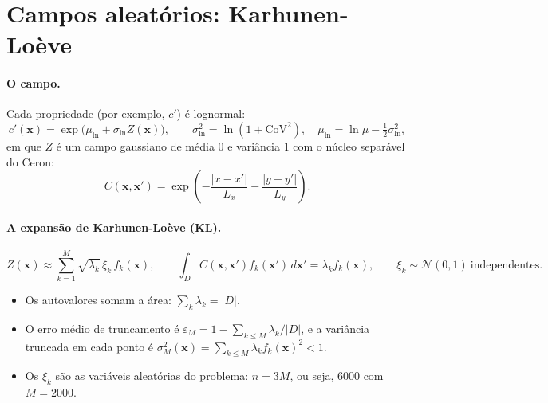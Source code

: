 \section{Campos aleatórios: Karhunen-Loève}
\label{sec:campos}

\paragraph{O campo.} Cada propriedade (por exemplo, $c'$) é lognormal:
\begin{equation}
  c'(\bm x) = \exp\big(\mu_{\ln} + \sigma_{\ln} Z(\bm x)\big), \qquad
  \sigma_{\ln}^2 = \ln(1 + \mathrm{CoV}^2), \quad \mu_{\ln} = \ln\mu - \tfrac12 \sigma_{\ln}^2 ,
\end{equation}
em que $Z$ é um campo gaussiano de média 0 e variância 1 com o núcleo separável do Ceron:
\begin{equation}
  C(\bm x, \bm x') = \exp\!\left(-\frac{|x - x'|}{L_x} - \frac{|y - y'|}{L_y}\right).
\end{equation}

\paragraph{A expansão de Karhunen-Loève (KL).}
\begin{equation}
  Z(\bm x) \approx \sum_{k=1}^{M} \sqrt{\lambda_k}\, \xi_k\, f_k(\bm x), \qquad
  \int_D C(\bm x, \bm x') f_k(\bm x')\, d\bm x' = \lambda_k f_k(\bm x), \qquad \xi_k \sim \mathcal N(0,1)
  \ \text{independentes}.
\end{equation}
\begin{itemize}
  \item Os autovalores somam a área: $\sum_k \lambda_k = |D|$.
  \item O erro médio de truncamento é $\varepsilon_M = 1 - \sum_{k\leq M} \lambda_k/|D|$, e a variância truncada em
    cada ponto é $\sigma_M^2(\bm x) = \sum_{k\leq M} \lambda_k f_k(\bm x)^2 < 1$.
  \item Os $\xi_k$ são as variáveis aleatórias do problema: $n = 3M$, ou seja, 6000 com $M = 2000$.
\end{itemize}

